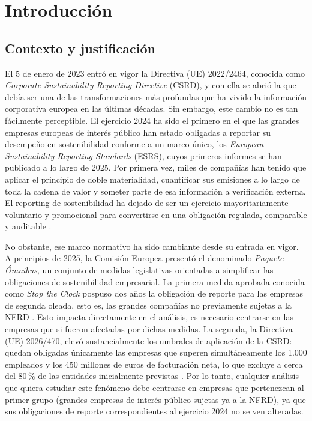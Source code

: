 \chapter{Introducción}
\label{cap:introduccion}

\section{Contexto y justificación}
\label{sec:contexto}

El 5 de enero de 2023 entró en vigor la Directiva (UE) 2022/2464, conocida como
\textit{Corporate Sustainability Reporting Directive} (CSRD), y con ella se abrió la que debía ser una
de las transformaciones más profundas que ha vivido la información corporativa europea en las
últimas décadas. Sin embargo, este cambio no es tan fácilmente perceptible.
El ejercicio 2024 ha sido el primero en el que las grandes empresas europeas de interés público
han estado obligadas a reportar su desempeño en sostenibilidad conforme a un marco
único, los \textit{European Sustainability Reporting Standards} (ESRS), cuyos primeros
informes se han publicado a lo largo de 2025. Por primera vez, miles de compañías han tenido
que aplicar el principio de doble materialidad, cuantificar sus emisiones a lo largo de toda
la cadena de valor y someter parte de esa información a verificación externa. El reporting de
sostenibilidad ha dejado de ser un ejercicio mayoritariamente voluntario y promocional para
convertirse en una obligación regulada, comparable y auditable \parencite{csrd2022}.

No obstante, ese marco normativo ha sido cambiante desde su entrada en vigor.
A principios de 2025, la Comisión Europea presentó el denominado \textit{Paquete Ómnibus}, un
conjunto de medidas legislativas orientadas a simplificar las obligaciones de sostenibilidad
empresarial. La primera medida aprobada conocida como \textit{Stop the Clock} pospuso dos años la obligación de reporte para las empresas de
segunda oleada, esto es, las grandes compañías no previamente sujetas a la NFRD
\parencite{omnibus2025}. Esto impacta directamente en el análisis, es necesario centrarse en las empresas que si fueron afectadas por dichas medidas.
La segunda, la Directiva (UE) 2026/470, elevó sustancialmente los
umbrales de aplicación de la CSRD: quedan obligadas únicamente las empresas que superen
simultáneamente los 1.000 empleados y los 450 millones de euros de facturación neta, lo que
excluye a cerca del 80\,\% de las entidades inicialmente previstas \parencite{omnibus2026}.
Por lo tanto, cualquier análisis que quiera estudiar este fenómeno debe centrarse en empresas que
pertenezcan al primer grupo (grandes empresas de interés público
sujetas ya a la NFRD), ya que sus obligaciones de reporte correspondientes al ejercicio
2024 no se ven alteradas.

